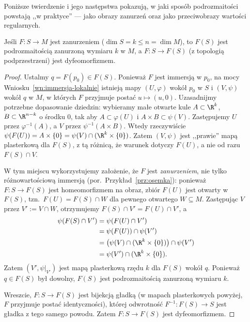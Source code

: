 Poniższe twierdzenie i jego następstwa pokazują, w jaki sposób podrozmaitości powstają ,,w
praktyce'' — jako obrazy zanurzeń oraz jako przeciwobrazy wartości regularnych.

\begin{twierdzenie}\label{tw:obraz}
Jeśli $F\colon S\to M$ jest zanurzeniem ($\dim S=k\leq n=\dim M$), to $F(S)$ jest
podrozmaitością zanurzoną wymiaru $k$ w $M$, a $F\colon S\to F(S)$ (z topologią
podprzestrzeni) jest dyfeomorfizmem.
\end{twierdzenie}
\begin{proof}
Ustalmy $q=F(p_0)\in F(S)$. Ponieważ $F$ jest immersją w $p_0$, na mocy
Wniosku~\ref{wn:immersja-lokalnie} istnieją mapy $(U,\varphi)$ wokół $p_0$ w $S$ i
$(V,\psi)$ wokół $q$ w $M$, w których $F$ przyjmuje postać $u\mapsto(u,0)$.
Uzasadnijmy potrzebne dopasowanie dziedzin: wybieramy małe otwarte
kule $A\subset\R^k$, $B\subset\R^{n-k}$ o środku $0$, tak aby
$A\subset\varphi(U)$ i $A\times B\subset\psi(V)$.
Zastępujemy $U$ przez $\varphi^{-1}(A)$, a $V$ przez
$\psi^{-1}(A\times B)$. Wtedy rzeczywiście
$\psi(F(U))=A\times\{0\}=\psi(V)\cap(\R^k\times\{0\})$.
Zatem $(V,\psi)$ jest ,,prawie'' mapą
plasterkową dla $F(S)$, z tą różnicą, że warunek dotyczy $F(U)$, a nie od razu $F(S)\cap V$.

W tym miejscu wykorzystujemy założenie, że $F$ jest \emph{zanurzeniem}, nie tylko
różnowartościową immersją (por.\ Przykład~\ref{prz:osemka}): ponieważ $F\colon S\to F(S)$
jest homeomorfizmem na obraz, zbiór $F(U)$ jest otwarty w $F(S)$, tzn.\ $F(U)=F(S)\cap W$
dla pewnego otwartego $W\subseteq M$. Zastępując $V$ przez $V':=V\cap W$, otrzymujemy
$F(S)\cap V'=F(U)\cap V'$, a
\begin{align*}
\psi(F(S)\cap V')
 &=\psi(F(U)\cap V')\\
 &=\psi(F(U))\cap\psi(V')\\
 &=\big(\psi(V)\cap(\R^k\times\{0\})\big)\cap\psi(V')\\
 &=\psi(V')\cap(\R^k\times\{0\}).
\end{align*}
Zatem $(V',\psi|_{V'})$ jest mapą plasterkową rzędu $k$ dla $F(S)$ wokół $q$. Ponieważ
$q\in F(S)$ był dowolny, $F(S)$ jest podrozmaitością zanurzoną wymiaru $k$.

Wreszcie, $F\colon S\to F(S)$ jest bijekcją gładką (w mapach plasterkowych powyżej, $F$
przyjmuje postać identyczności), której odwrotność $F^{-1}\colon F(S)\to S$ jest gładka z
tego samego powodu. Zatem $F\colon S\to F(S)$ jest dyfeomorfizmem.
\end{proof}

